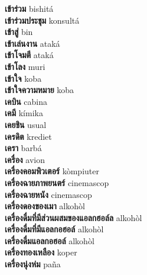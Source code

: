 \textbf{ เข้าร่วม  } bishitá \\
\textbf{ เข้าร่วมประชุม  } konsultá \\
\textbf{ เข้าสู่  } bin \\
\textbf{ เข้าเล่นงาน  } ataká \\
\textbf{ เข้าโจมตี  } ataká \\
\textbf{ เข้าโลง  } muri \\
\textbf{ เข้าใจ  } koba \\
\textbf{ เข้าใจความหมาย  } koba \\
\textbf{ เคบิน  } cabina \\
\textbf{ เคมี  } kímika \\
\textbf{ เคยชิน  } usual \\
\textbf{ เครดิต  } krediet \\
\textbf{ เครา  } barbá \\
\textbf{ เครื่อง  } avion \\
\textbf{ เครื่องคอมพิวเตอร์  } kòmpiuter \\
\textbf{ เครื่องฉายภาพยนตร์  } cinemascop \\
\textbf{ เครื่องฉายหนัง  } cinemascop \\
\textbf{ เครื่องดองของเมา  } alkohòl \\
\textbf{ เครื่องดื่มที่มีส่วนผสมของแอลกฮอล์ล  } alkohòl \\
\textbf{ เครื่องดื่มที่มีแอลกอฮอล์  } alkohòl \\
\textbf{ เครื่องดื่มแอลกอฮอล์  } alkohòl \\
\textbf{ เครื่องทองเหลือง  } koper \\
\textbf{ เครื่องนุ่งห่ม  } paña \\
